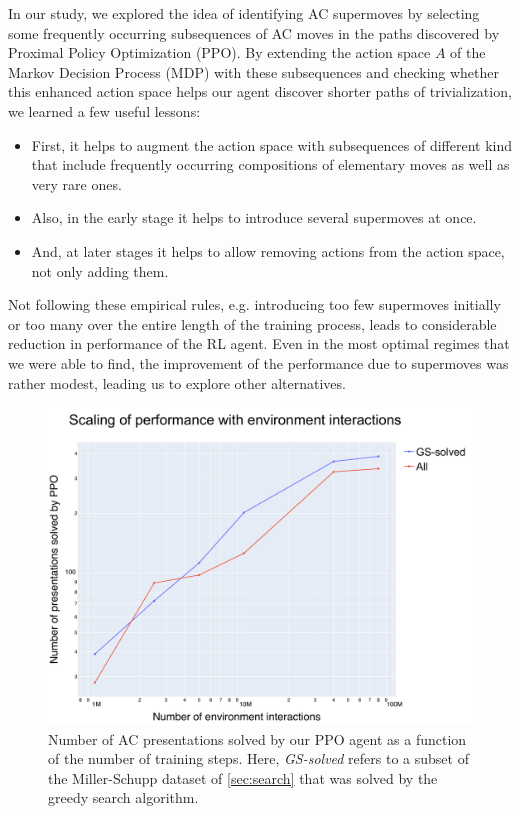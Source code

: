 In our study, we explored the idea of identifying AC supermoves by selecting some frequently occurring subsequences of AC moves in the paths discovered by Proximal Policy Optimization (PPO). By extending the action space $A$ of the Markov Decision Process (MDP) with these subsequences and checking whether this enhanced action space helps our agent discover shorter paths of trivialization, we learned a few useful lessons:

\begin{itemize}
	
	\item First, it helps to augment the action space with subsequences of different kind that include frequently occurring compositions of elementary moves as well as very rare ones.
	
	\item Also, in the early stage it helps to introduce several supermoves at once.
	
	\item And, at later stages it helps to allow removing actions from the action space, not only adding them.
\end{itemize}

\noindent
Not following these empirical rules, e.g. introducing too few supermoves initially or too many over the entire length of the training process, leads to considerable reduction in performance of the RL agent. Even in the most optimal regimes that we were able to find, the improvement of the performance due to supermoves was rather modest, leading us to explore other alternatives.

\begin{figure}
	\centering
	\includegraphics[scale=0.35]{fig/scaling_env.pdf}
	\caption{Number of AC presentations solved by our PPO agent as a function of the number of training steps. Here, \textit{GS-solved} refers to a subset of the Miller-Schupp dataset of \autoref{sec:search} that was solved by the greedy search algorithm.}
	\label{fig:scaling_env}
\end{figure}

